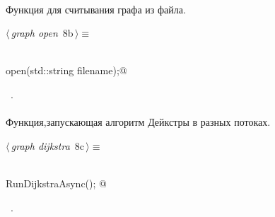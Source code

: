\documentclass[12pt]{article}
\begin{document}
\paragraph{}
Функция для считывания графа из файла.

\begin{flushleft} \small
\begin{minipage}{\linewidth}\label{scrap10}\raggedright\small
{} $\langle\,${\itshape graph open}\nobreak\ {\footnotesize {8b}}$\,\rangle\equiv$
\vspace{-1ex}
\begin{list}{}{} \item
\mbox{}\verb@@\\
\mbox{}\verb@void open(std::string filename);@\\
\mbox{}\verb@@{\NWsep}
\end{list}
\vspace{-1.5ex}
\footnotesize
\begin{list}{}{\setlength{\itemsep}{-\parsep}\setlength{\itemindent}{-\leftmargin}}
\item \NWtxtMacroRefIn\ .

\item{}
\end{list}
\end{minipage}\vspace{4ex}
\end{flushleft}
\paragraph{}
Функция,запускающая алгоритм Дейкстры в разных потоках.
\begin{flushleft} \small
\begin{minipage}{\linewidth}\label{scrap11}\raggedright\small
{} $\langle\,${\itshape graph dijkstra}\nobreak\ {\footnotesize {8c}}$\,\rangle\equiv$
\vspace{-1ex}
\begin{list}{}{} \item
\mbox{}\verb@@\\
\mbox{}\verb@double RunDijkstraAsync();    @\\
\mbox{}\verb@@{\NWsep}
\end{list}
\vspace{-1.5ex}
\footnotesize
\begin{list}{}{\setlength{\itemsep}{-\parsep}\setlength{\itemindent}{-\leftmargin}}
\item \NWtxtMacroRefIn\ .

\item{}
\end{list}
\end{minipage}\vspace{4ex}
\end{flushleft}
\end{document}
